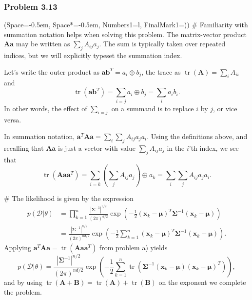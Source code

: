 \documentclass[12pt, a4paper]{article}
\newcommand{\listSpace}{-0.5em}%
\newcommand{\D}{\mathcal{D}}
\newcommand{\vect}[1]{\bm{#1}}
\newcommand{\abs}[1]{\left\lvert#1\right\rvert}
\begin{document}
\subsubsection*{Problem 3.13}
\begin{easylist}[enumerate]
\ListProperties(Space=\listSpace, Space*=\listSpace, Numbers1=l, FinalMark1={)})
# Familiarity with summation notation helps when solving this problem.
The matrix-vector product $\vect{A}\vect{a}$ may be written as $\sum_j A_{ij} a_j$.
The sum is typically taken over repeated indices, but we will explicitly typeset the summation index.

Let's write the outer product as $\vect{a}\vect{b}^T = a_i \oplus b_j$, the trace as $\operatorname{tr}(\vect{A}) = \sum_i A_{ii}$ and
\begin{equation*}
	\operatorname{tr}(\vect{a}\vect{b}^T) = \sum_{i = j} a_i \oplus b_j = \sum_{i} a_i b_i.
\end{equation*}
In other words, the effect of $\sum_{i = j}$ on a summand is to replace $i$ by $j$, or vice versa.

In summation notation, $\vect{a}^T \vect{A} \vect{a} = \sum_i \sum_j A_{ij} a_j a_i$.
Using the definitions above, and recalling that $\vect{A} \vect{a}$ is just a vector with value $\sum_j A_{ij} a_j$ in the $i$'th index, we see that
\begin{equation*}
	\operatorname{tr}( \vect{A} \vect{a} \vect{a}^T) = \sum_{i=k}  \left( \sum_j A_{ij} a_j \right) \oplus a_k = \sum_i \sum_j A_{ij} a_j a_i.
\end{equation*}

# The likelihood is given by the expression
\begin{align*}
	p(\D | \theta) &= \prod_{k=1}^{n} \frac{\abs{\vect{\Sigma}^{-1}}^{1/2}}{\left(2 \pi \right)^{d/2}} \exp \left( -\frac{1}{2} \left( \vect{x}_k - \vect{\mu} \right)^T  \vect{\Sigma}^{-1}  \left( \vect{x}_k - \vect{\mu} \right)\right) \\
	&=  \frac{\abs{\vect{\Sigma}^{-1}}^{n/2}}{\left(2 \pi \right)^{nd/2}} \exp \left( -\frac{1}{2}  \sum_{k=1}^{n} \left( \vect{x}_k - \vect{\mu} \right)^T  \vect{\Sigma}^{-1}  \left( \vect{x}_k - \vect{\mu} \right)\right).
\end{align*}
Applying $ \vect{a}^T \vect{A} \vect{a} = \operatorname{tr}( \vect{A} \vect{a} \vect{a}^T)$ from problem a) yields
\begin{equation*}
p(\D | \theta) = \frac{\abs{\vect{\Sigma}^{-1}}^{n/2}}{\left(2 \pi \right)^{nd/2}} \exp \left( -\frac{1}{2}  \sum_{k=1}^{n} 
\operatorname{tr} \left( \vect{\Sigma}^{-1} \left( \vect{x}_k - \vect{\mu} \right) \left( \vect{x}_k - \vect{\mu} \right)^T \right)
\right),
\end{equation*}
and by using $\operatorname{tr}\left(\vect{A} + \vect{B}\right) = \operatorname{tr}\left(\vect{A}\right) + \operatorname{tr}\left( \vect{B}\right)$ on the exponent we complete the problem.


\end{easylist}
\end{document}
